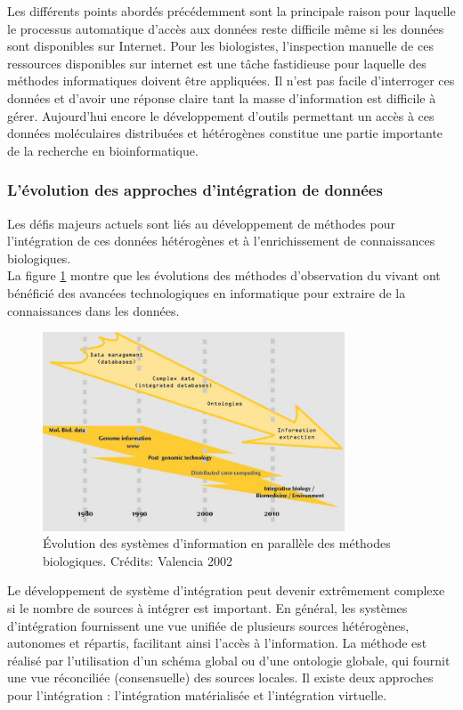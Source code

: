 Les différents points abordés précédemment sont la principale raison pour laquelle le processus automatique d’accès aux données reste difficile même si les données sont disponibles sur Internet. Pour les biologistes, l'inspection manuelle de ces ressources disponibles sur internet est une tâche fastidieuse pour laquelle des méthodes informatiques doivent être appliquées. Il n’est pas facile d’interroger ces données et d’avoir une réponse claire tant la masse d’information est difficile à gérer. Aujourd'hui encore le développement d'outils permettant un accès à ces données moléculaires distribuées et hétérogènes constitue une partie importante de la recherche en bioinformatique. 

\subsubsection{L'évolution des approches d'intégration de données}
Les défis majeurs actuels sont liés au développement de méthodes pour l’intégration de ces données hétérogènes et à l’enrichissement de connaissances biologiques.\\
La figure \ref{fig:databases} montre que les évolutions des méthodes d'observation du vivant ont bénéficié des avancées technologiques en informatique pour extraire de la connaissances dans les données\cite{valencia2002}.

 \begin{figure}[!ht]
    \centering
    \includegraphics[width=0.8\textwidth]{hdr_manuscript/Figures/valencia2002.jpg}
    \caption{ Évolution des systèmes d'information en parallèle des méthodes biologiques. Crédits: Valencia 2002 \cite{valencia2002}}
    \label{fig:databases}
\end{figure}
Le développement de système d'intégration peut devenir extrêmement complexe si le nombre de sources à intégrer est important. En général, les systèmes d’intégration fournissent une vue unifiée de plusieurs sources hétérogènes, autonomes et répartis, facilitant ainsi l’accès à l’information. La méthode est réalisé par l’utilisation d’un schéma global ou d’une ontologie globale, qui fournit une vue réconciliée (consensuelle) des sources locales. Il existe deux   approches   pour   l’intégration :   l’intégration   matérialisée   et   l’intégration   virtuelle. \\

